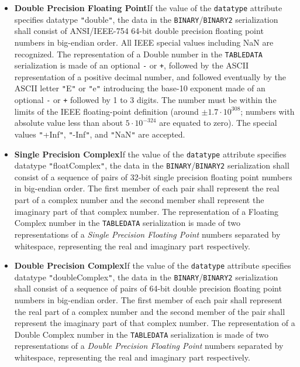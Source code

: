 \documentclass[11pt,a4paper]{ivoa}
\let\fg=\color
\def\attr#1{{\tt{\fg{DarkRed}#1}}}
\def\elem#1{{\tt{\fg{DarkRed}#1}}}
\def\literalvalue#1{{\tt"}{{\fg{DarkPurple}#1}}{\tt"}}
\begin{document}
{\begin{itemize}
\item {\bf Double Precision Floating Point}\quad If
the value of the {\attr{datatype}}
attribute specifies datatype {\literalvalue{double}},
the data in the \elem{BINARY}/\elem{BINARY2} serialization shall consist of ANSI/IEEE-754
64-bit double precision floating point numbers in big-endian order.
All IEEE special values including NaN are recognized.
The representation of a Double number in the
\elem{TABLEDATA} serialization is made of an optional {\tt-} or {\tt+},
followed by the ASCII representation of a positive decimal number,
and followed eventually by the ASCII letter \literalvalue{E} or  \literalvalue{e}
introducing the base-10 exponent made of an optional {\tt-} or {\tt+}
followed by 1 to 3 digits. The number must be within the limits of the
IEEE floating-point definition (around $\pm1.7\cdot10^{308}$; numbers with
absolute value less than about $5\cdot10^{-324}$ are equated to zero).
The special
values \literalvalue{+Inf}, \literalvalue{-Inf}, and \literalvalue{NaN} are accepted.

\item {\bf Single Precision Complex}\quad If the value of the {\attr{datatype}}
attribute specifies datatype {\literalvalue{floatComplex}},
the data in the \elem{BINARY}/\elem{BINARY2} serialization shall consist of a sequence of
pairs of 32-bit single precision floating point numbers in big-endian order.
The first member of each
pair shall represent the real part of a complex number and the
second member shall represent the imaginary part of that complex
number.
The representation of a Floating Complex number in the
\elem{TABLEDATA} serialization is made of two representations
of a {\em  Single Precision Floating Point} numbers separated by
whitespace, representing the real and imaginary part respectively.

\item {\bf Double Precision Complex}\quad If the
value of the {\attr{datatype}}
attribute specifies datatype {\literalvalue{doubleComplex}},
the data in the \elem{BINARY}/\elem{BINARY2} serialization  shall consist of a
sequence of pairs of 64-bit double precision floating point numbers
in big-endian order.
The first member of each pair shall represent the real part of a
complex number and the second member of the pair shall represent the
imaginary part of that complex number.
The representation of a Double Complex number in the
\elem{TABLEDATA} serialization is made of two representations
of a {\em  Double Precision Floating Point} numbers separated by
whitespace, representing the real and imaginary part respectively.
\end{itemize}


}
\end{document}

